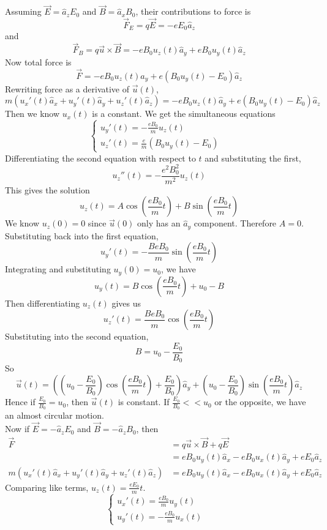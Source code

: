 \documentclass[answers]{exam}
\begin{document}
\begin{questions}
\begin{solution}
    Assuming $\vec E = \hat a_zE_0$ and $\vec B = \hat a_xB_0$, their contributions to force is
    $$\vec F_E = q\vec E = -eE_0\hat a_z$$
    and
    $$\vec F_B = q\vec u \times \vec B = -eB_0u_z(t) \hat a_y + eB_0u_y(t)\hat a_z$$
    Now total force is
    $$\vec F = -eB_0u_z(t) \hat a_y + e(B_0u_y(t) - E_0) \hat a_z$$
    Rewriting force as a derivative of $\vec u(t)$,
    $$m(u_x'(t)\hat a_x + u_y'(t)\hat a_y + u_z'(t)\hat a_z) = -eB_0u_z(t) \hat a_y + e(B_0u_y(t) - E_0) \hat a_z$$
    Then we know $u_x(t)$ is a constant. We get the simultaneous equations
    $$\begin{cases} u_y'(t) = -\frac{eB_0}{m} u_z(t) & \\ u_z'(t) = \frac{e}{m} (B_0u_y(t) - E_0) & \end{cases}$$
    Differentiating the second equation with respect to $t$ and substituting the first,
    $$u_z''(t) = -\frac{e^2B_0^2}{m^2} u_z(t)$$
    This gives the solution
    $$u_z(t) = A\cos\left(\frac{eB_0}{m}t\right) + B\sin\left(\frac{eB_0}{m}t\right)$$
    We know $u_z(0) = 0$ since $\vec u(0)$ only has an $\hat a_y$ component. Therefore $A = 0$. Substituting back into the first equation,
    $$u_y'(t) = -\frac{BeB_0}{m} \sin\left(\frac{eB_0}{m}t\right)$$
    Integrating and substituting $u_y(0) = u_0$, we have
    $$u_y(t) = B\cos\left(\frac{eB_0}{m}t\right) + u_0 - B$$
    Then differentiating $u_z(t)$ gives us
    $$u_z'(t) = \frac{BeB_0}{m} \cos\left(\frac{eB_0}{m}t\right)$$
    Substituting into the second equation,
    $$B = u_0 - \frac{E_0}{B_0}$$
    So
    $$\vec u(t) = \left(\left(u_0 - \frac{E_0}{B_0}\right)\cos\left(\frac{eB_0}{m}t\right) + \frac{E_0}{B_0}\right)\hat a_y + \left(u_0 - \frac{E_0}{B_0}\right)\sin\left(\frac{eB_0}{m}t\right)\hat a_z$$
    Hence if $\frac{E_0}{B_0} = u_0$, then $\vec u(t)$ is constant. If $\frac{E_0}{B_0} << u_0$ or the opposite, we have an almost circular motion. \\
    Now if $\vec E = -\hat a_zE_0$ and $\vec B = -\hat a_zB_0$, then
    \begin{align*}
        \vec F &= q\vec u \times \vec B + q\vec E \\
               &= eB_0u_y(t) \hat a_x - eB_0u_x(t) \hat a_y + eE_0\hat a_z \\
        m(u_x'(t)\hat a_x + u_y'(t)\hat a_y + u_z'(t)\hat a_z) &= eB_0u_y(t) \hat a_x - eB_0u_x(t) \hat a_y + eE_0\hat a_z
    \end{align*}
    Comparing like terms, $u_z(t) = \frac{eE_0}{m}t$.
    $$\begin{cases} u_x'(t) = \frac{eB_0}{m} u_y(t) & \\ u_y'(t) = -\frac{eB_0}{m} u_x(t) & \end{cases}$$

\end{solution}
\end{questions}
\end{document}

